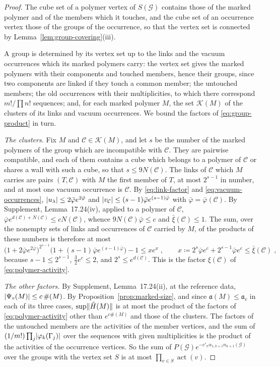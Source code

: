 \documentclass[11pt]{preprint}
\DeclarePairedDelimiter{\abs}{\lvert}{\rvert}
\DeclarePairedDelimiter{\norm}{\lVert}{\rVert}
\numberwithin{equation}{section}
\theoremstyle{definition}
\theoremstyle{remark}
\theoremstyle{plain}
\begin{document}
\begin{proof}
The cube set of a polymer vertex of $S(\mathcal G)$ contains those of the marked polymer and of the members which it touches, and the cube set of an occurrence vertex those of the groups of the occurrence, so that the vertex set is connected by Lemma~\ref{lem:group-covering}(iii).

A group is determined by its vertex set up to the links and the vacuum occurrences which its marked polymers carry: the vertex set gives the marked polymers with their components and touched members, hence their groups, since two components are linked if they touch a common member; the untouched members; the old occurrences with their multiplicities, to which there correspond $m!/\prod n!$ sequences; and, for each marked polymer $M$, the set $\mathcal K(M)$ of the clusters of its links and vacuum occurrences. We bound the factors of \eqref{eq:group-product} in turn.

\emph{The clusters.} Fix $M$ and $\mathcal C \in \mathcal K(M)$, and let $s$ be the number of the marked polymers of the group which are incompatible with $\mathcal C$. They are pairwise compatible, and each of them contains a cube which belongs to a polymer of $\mathcal C$ or shares a wall with such a cube, so that $s \leq 9N(\mathcal C)$. The links of $\mathcal C$ which $M$ carries are pairs $(T, \mathcal C)$ with $M$ the first member of $T$, at most $2^{s-1}$ in number, and at most one vacuum occurrence is $\mathcal C$. By \eqref{eq:link-factor} and \eqref{eq:vacuum-occurrences}, $\abs{u_\lambda} \leq 2\bar\varphi e^{2\bar\varphi}$ and $\abs{v_{\mathcal C}} \leq (s - 1)\bar\varphi e^{(s-1)\bar\varphi}$ with $\bar\varphi = \bar\varphi(\mathcal C)$. By Supplement, Lemma~17.24(iv), applied to a polymer of $\mathcal C$, $\bar\varphi e^{d(\mathcal C) + N(\mathcal C)} \leq cN(\mathcal C)$, whence $9N(\mathcal C)\bar\varphi \leq c$ and $\bar\xi(\mathcal C) \leq 1$. The sum, over the nonempty sets of links and occurrences of $\mathcal C$ carried by $M$, of the products of these numbers is therefore at most
\[
    \bigl(1 + 2\bar\varphi e^{2\bar\varphi}\bigr)^{2^{s-1}}\bigl(1 + (s - 1)\bar\varphi e^{(s-1)\bar\varphi}\bigr) - 1 \leq xe^x\;,
    \qquad
    x \coloneqq 2^s\bar\varphi e^c + 2^{s-1}\bar\varphi e^c \leq \bar\xi(\mathcal C)\;,
\]
because $s - 1 \leq 2^{s-1}$, $\frac32e^c \leq 2$, and $2^s \leq e^{d(\mathcal C)}$. This is the factor $\xi(\mathcal C)$ of \eqref{eq:polymer-activity}.

\emph{The other factors.} By Supplement, Lemma~17.24(ii), at the reference data, $\abs{\Psi_\circ(M)} \leq c\,\#(M)$. By Proposition~\ref{prop:marked-size}, and since $\mathfrak a(M) \leq \mathfrak a_v$ in each of its three cases, $\sup\norm{\tilde H(M)}$ is at most the product of the factors of \eqref{eq:polymer-activity} other than $e^{c\#(M)}$ and those of the clusters. The factors of the untouched members are the activities of the member vertices, and the sum of $(1/m!)\prod_j\abs{\varphi_k(\Gamma_j)}$ over the sequences with given multiplicities is the product of the activities of the occurrence vertices. So the sum of $P(\mathcal G)e^{-c'_\pi\alpha_{1,k+1}n_{k+1}(\mathcal G)}$ over the groups with the vertex set $S$ is at most $\prod_{v \in S}\operatorname{act}(v)$.


\end{proof}
\end{document}
